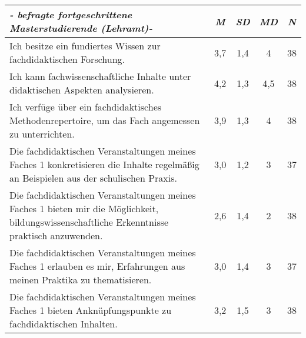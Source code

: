 \documentclass{book}
\begin{document}



    \begin{tabularx}{\textwidth}{BSSSS}
        \textit{- befragte fortgeschrittene Masterstudierende (Lehramt)-} & \textit{M} & \textit{SD} & \textit{MD} & \textit{N} \\ \hline
        Ich besitze ein fundiertes Wissen zur fachdidaktischen Forschung. & 3,7 & 1,4 & 4 & 38 \\ \hline
        Ich kann fachwissenschaftliche Inhalte unter didaktischen Aspekten analysieren. & 4,2 & 1,3 & 4,5 & 38 \\ \hline
        Ich verfüge über ein fachdidaktisches Methodenrepertoire, um das Fach angemessen zu unterrichten. & 3,9 & 1,3 & 4 & 38 \\ \hline
        Die fachdidaktischen Veranstaltungen meines Faches 1 konkretisieren die Inhalte regelmäßig an Beispielen aus der schulischen Praxis. & 3,0 & 1,2 & 3 & 37 \\ \hline
        Die fachdidaktischen Veranstaltungen meines Faches 1 bieten mir die Möglichkeit, bildungswissenschaftliche Erkenntnisse praktisch anzuwenden. & 2,6 & 1,4 & 2 & 38 \\ \hline
        Die fachdidaktischen Veranstaltungen meines Faches 1 erlauben es mir, Erfahrungen aus meinen Praktika zu thematisieren. & 3,0 & 1,4 & 3 & 37 \\ \hline
        Die fachdidaktischen Veranstaltungen meines Faches 1 bieten Anknüpfungspunkte zu fachdidaktischen Inhalten. & 3,2 & 1,5 & 3 & 38 \\ \hline
    \end{tabularx}
    \normalspacing
    \vspace{0.5cm}

\end{document}
